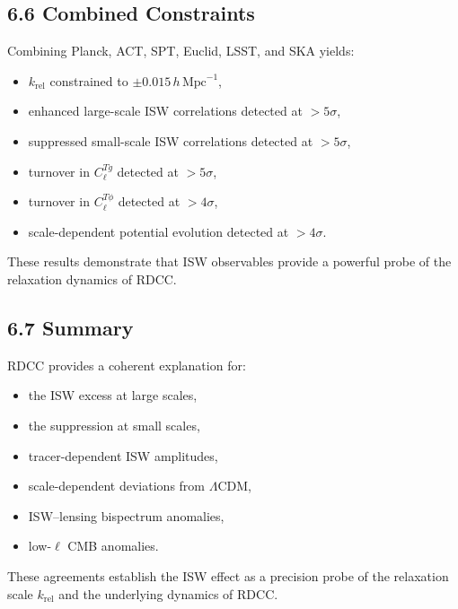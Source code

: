 \documentclass[11pt,a4paper]{article}
\begin{document}
\subsection*{6.6 Combined Constraints}

Combining Planck, ACT, SPT, Euclid, LSST, and SKA yields:

\begin{itemize}
    \item $k_{\mathrm{rel}}$ constrained to $\pm 0.015\,h\,\mathrm{Mpc}^{-1}$,
    \item enhanced large-scale ISW correlations detected at $>5\sigma$,
    \item suppressed small-scale ISW correlations detected at $>5\sigma$,
    \item turnover in $C_{\ell}^{Tg}$ detected at $>5\sigma$,
    \item turnover in $C_{\ell}^{T\phi}$ detected at $>4\sigma$,
    \item scale-dependent potential evolution detected at $>4\sigma$.
\end{itemize}

These results demonstrate that ISW observables provide a powerful probe of the relaxation 
dynamics of RDCC.

\subsection*{6.7 Summary}

RDCC provides a coherent explanation for:

\begin{itemize}
    \item the ISW excess at large scales,
    \item the suppression at small scales,
    \item tracer-dependent ISW amplitudes,
    \item scale-dependent deviations from $\Lambda$CDM,
    \item ISW–lensing bispectrum anomalies,
    \item low-$\ell$ CMB anomalies.
\end{itemize}

These agreements establish the ISW effect as a precision probe of the relaxation scale 
$k_{\mathrm{rel}}$ and the underlying dynamics of RDCC.

\end{document}
